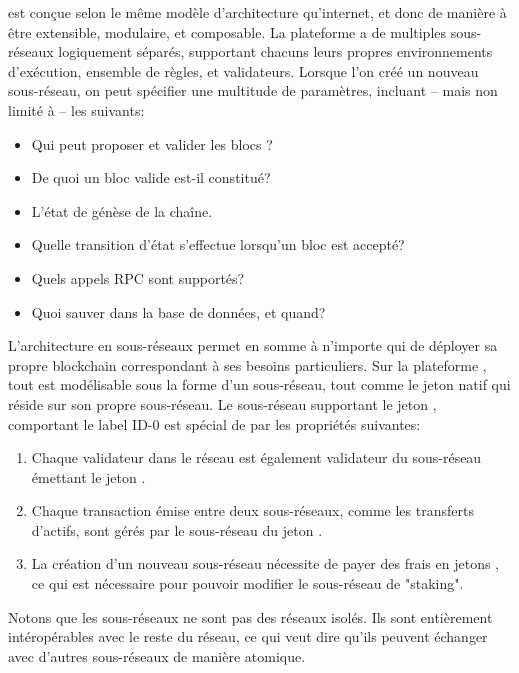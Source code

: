 \documentclass[runningheads]{llncs}
\begin{document}
\AVAPlatformName{} est conçue selon le même modèle d'architecture qu'internet, et donc de manière à être extensible,
modulaire, et composable. La plateforme \AVAPlatformName{} a de multiples sous-réseaux logiquement séparés, supportant
chacuns leurs propres environnements d'exécution, ensemble de règles, et validateurs. Lorsque l'on créé un nouveau
sous-réseau, on peut spécifier une multitude de paramètres, incluant -- mais non limité à -- les suivants:
\begin{itemize}
\item{} Qui peut proposer et valider les blocs ?
\item{} De quoi un bloc valide est-il constitué?
\item{} L'état de génèse de la chaîne.
\item{} Quelle transition d'état s'effectue lorsqu'un bloc est accepté?
\item{} Quels appels RPC sont supportés?
\item{} Quoi sauver dans la base de données, et quand?
\end{itemize}
L'architecture en sous-réseaux permet en somme à n'importe qui de déployer sa propre blockchain correspondant à ses
besoins particuliers. Sur la plateforme \AVAPlatformName{}, tout est modélisable sous la forme d'un sous-réseau, tout
comme le jeton natif \AVATokenName{} qui réside sur son propre sous-réseau. Le sous-réseau supportant le jeton
\AVATokenName{}, comportant le label ID-0 est spécial de par les propriétés suivantes:
\begin{enumerate}
\item Chaque validateur dans le réseau \AVAPlatformName{} est également validateur du sous-réseau émettant le jeton
\AVATokenName{}.
\item Chaque transaction émise entre deux sous-réseaux, comme les transferts d'actifs, sont gérés par le sous-réseau du
jeton \AVATokenName{}.
\item La création d'un nouveau sous-réseau nécessite de payer des frais en jetons \AVATokenName{}, ce qui est nécessaire
pour pouvoir modifier le sous-réseau de "staking".
\end{enumerate}
Notons que les sous-réseaux ne sont pas des réseaux isolés. Ils sont entièrement intéropérables avec le reste du réseau,
ce qui veut dire qu'ils peuvent échanger avec d'autres sous-réseaux de manière atomique.
\end{document}
